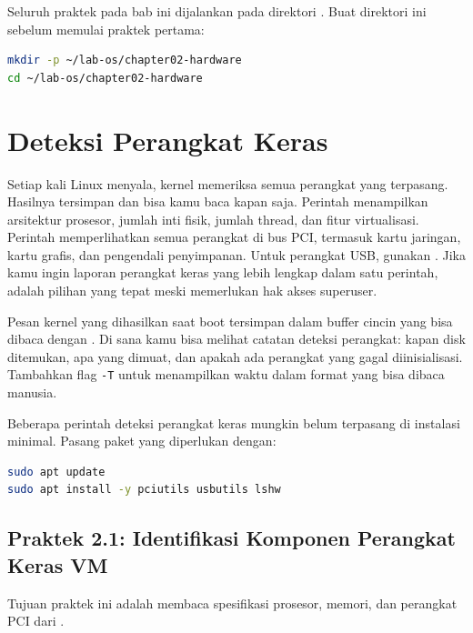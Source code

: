 \begin{notebox}
Seluruh praktek pada bab ini dijalankan pada direktori .
Buat direktori ini sebelum memulai praktek pertama:
\begin{lstlisting}[language=bash]
mkdir -p ~/lab-os/chapter02-hardware
cd ~/lab-os/chapter02-hardware
\end{lstlisting}
\end{notebox}

\section{Deteksi Perangkat Keras}
\label{sec:hardware-detection}

Setiap kali Linux menyala, kernel memeriksa semua perangkat yang terpasang. Hasilnya tersimpan dan bisa kamu baca kapan saja. Perintah  menampilkan arsitektur prosesor, jumlah inti fisik, jumlah thread, dan fitur virtualisasi. Perintah  memperlihatkan semua perangkat di bus PCI, termasuk kartu jaringan, kartu grafis, dan pengendali penyimpanan. Untuk perangkat USB, gunakan . Jika kamu ingin laporan perangkat keras yang lebih lengkap dalam satu perintah,  adalah pilihan yang tepat meski memerlukan hak akses superuser.

Pesan kernel yang dihasilkan saat boot tersimpan dalam buffer cincin yang bisa dibaca dengan . Di sana kamu bisa melihat catatan deteksi perangkat: kapan disk ditemukan,  apa yang dimuat, dan apakah ada perangkat yang gagal diinisialisasi. Tambahkan flag \texttt{-T} untuk menampilkan waktu dalam format yang bisa dibaca manusia.

\begin{tipbox}
Beberapa perintah deteksi perangkat keras mungkin belum terpasang di instalasi minimal. Pasang paket yang diperlukan dengan:
\begin{lstlisting}[language=bash]
sudo apt update
sudo apt install -y pciutils usbutils lshw
\end{lstlisting}
\end{tipbox}

\subsection*{Praktek 2.1: Identifikasi Komponen Perangkat Keras VM}

Tujuan praktek ini adalah membaca spesifikasi prosesor, memori, dan perangkat PCI dari .

